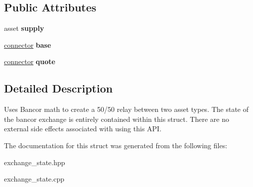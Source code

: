 \subsection*{Public Attributes}
\begin{DoxyCompactItemize}
\item 
\mbox{\label{structeosio_1_1exchange__state_a008ffaf59e6747087b39d58ad4d1907d}} 
asset {\bfseries supply}
\item 
\mbox{\label{structeosio_1_1exchange__state_ab6fc4150a3d9c76cf0c8b80f2f307141}} 
\mbox{\hyperlink{structeosio_1_1exchange__state_1_1connector}{connector}} {\bfseries base}
\item 
\mbox{\label{structeosio_1_1exchange__state_a113d14fa6ef420fbcb91cff8f67633ef}} 
\mbox{\hyperlink{structeosio_1_1exchange__state_1_1connector}{connector}} {\bfseries quote}
\end{DoxyCompactItemize}


\subsection{Detailed Description}
Uses Bancor math to create a 50/50 relay between two asset types. The state of the bancor exchange is entirely contained within this struct. There are no external side effects associated with using this A\+PI. 

The documentation for this struct was generated from the following files\+:\begin{DoxyCompactItemize}
\item 
exchange\+\_\+state.\+hpp\item 
exchange\+\_\+state.\+cpp\end{DoxyCompactItemize}
